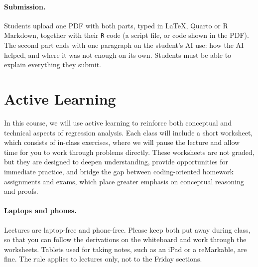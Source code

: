 \documentclass[PS]{syllabus}
\newif\ifrelease
\begin{document}
\begin{syllabus}
\paragraph*{Submission.} Students upload one PDF with both parts, typed in \LaTeX, Quarto or R Markdown, together with their {\tt R} code (a script file, or code shown in the PDF). The second part ends with one paragraph on the student's AI use: how the AI helped, and where it was not enough on its own. Students must be able to explain everything they submit.



\section*{Active Learning}

In this course, we will use active learning to reinforce both conceptual and technical aspects of regression analysis. Each class will include a short worksheet, which consists of in-class exercises, where we will pause the lecture and allow time for you to work through problems directly. These worksheets are not graded, but they are designed to deepen understanding, provide opportunities for immediate practice, and bridge the gap between coding-oriented homework assignments and exams, which place greater emphasis on conceptual reasoning and proofs.

\paragraph*{Laptops and phones.} Lectures are laptop-free and phone-free. Please keep both put away during class, so that you can follow the derivations on the whiteboard and work through the worksheets. Tablets used for taking notes, such as an iPad or a reMarkable, are fine. The rule applies to lectures only, not to the \ifrelease\else Friday \fi sections.


\end{syllabus}
\end{document}
